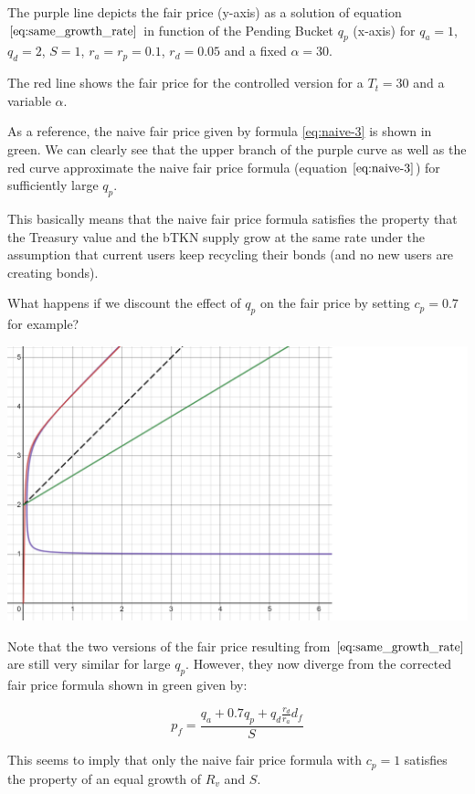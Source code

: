 \documentclass{article}
\begin{document}
The purple line depicts the fair price (y-axis) as a solution of equation $\ref{eq:same_growth_rate}$ in function of the Pending Bucket $q_p$ (x-axis) for $q_a=1$, $q_d=2$, $S=1$, $r_a=r_p=0.1$, $r_d=0.05$ and a fixed $\alpha=30$. 

The red line shows the fair price for the controlled version for a $T_t=30$ and a variable $\alpha$.

As a reference, the naive fair price given by formula \ref{eq:naive-3} is shown in green. We can clearly see that the upper branch of the purple curve as well as the red curve approximate the naive fair price formula (equation $\ref{eq:naive-3}$) for sufficiently large $q_p$. 

This basically means that the naive fair price formula satisfies the property that the Treasury value and the bTKN supply grow at the same rate under the assumption that current users keep recycling their bonds (and no new users are creating bonds).

\pagebreak

What happens if we discount the effect of $q_p$ on the fair price by setting $c_p=0.7$ for example?

\includegraphics[width=\linewidth]{./ChickenBonds_Whitepaper_growth_price_2.png}

Note that the two versions of the fair price resulting from $\ref{eq:same_growth_rate}$ are still very similar for large $q_p$. However, they now diverge from the corrected fair price formula shown in green given by:

\begin{equation}
  \label{eq:corrected-naive}
   p_f = \frac{q_a + 0.7q_p + q_d \frac{r_d}{r_a} d_f}{S}
\end{equation}

This seems to imply that only the naive fair price formula with $c_p=1$ satisfies the property of an equal growth of $R_v$ and $S$. 
\end{document}

